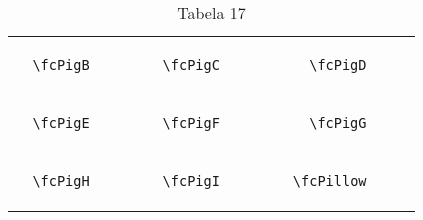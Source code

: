 \documentclass[x11names]{article}
\begin{document}
\begin{table}[H]
\begin{tabular}{|c|c|c|c|c|c|}
		&\multirow{5}{*}{	\fcPigB	[scale=0.4]} & &\multirow{5}{*}{	\fcPigC	[scale=0.4]} & &\multirow{5}{*}{	\fcPigD	[scale=0.4]}\\	& & & & & \\	& & & & & \\	\verb|	\fcPigB	| & & \verb|	\fcPigC	| & & \verb|	\fcPigD	| & \\	& & & & & \\	& & & & & \\	& & & & & \\	\hline									
		&\multirow{5}{*}{	\fcPigE	[scale=0.4]} & &\multirow{5}{*}{	\fcPigF	[scale=0.4]} & &\multirow{5}{*}{	\fcPigG	[scale=0.4]}\\	& & & & & \\	& & & & & \\	\verb|	\fcPigE	| & & \verb|	\fcPigF	| & & \verb|	\fcPigG	| & \\	& & & & & \\	& & & & & \\	& & & & & \\	\hline									
		&\multirow{5}{*}{	\fcPigH	[scale=0.4]} & &\multirow{5}{*}{	\fcPigI	[scale=0.4]} & &\multirow{5}{*}{	\fcPillow	[scale=0.4]}\\	& & & & & \\	& & & & & \\	\verb|	\fcPigH	| & & \verb|	\fcPigI	| & & \verb|	\fcPillow	| & \\	& & & & & \\	& & & & & \\	& & & & & \\		\hline 	\hline 	\end{tabular}	\caption{	Tabela 17	}\label{	Tab17	}\end{table}
\end{document}
